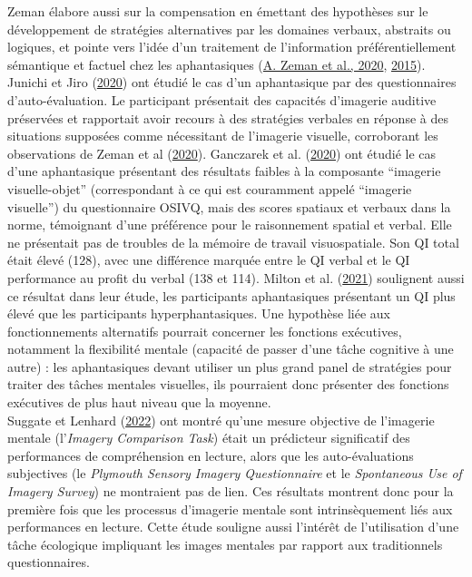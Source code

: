 \documentclass[
  12pt,
]{article}
\begin{document}
Zeman élabore aussi sur la compensation en émettant des hypothèses sur
le développement de stratégies alternatives par les domaines verbaux,
abstraits ou logiques, et pointe vers l'idée d'un traitement de
l'information préférentiellement sémantique et factuel chez les
aphantasiques
(\protect\hyperlink{ref-zemanPhantasiaPsychologicalSignificance2020}{A.
Zeman et al., 2020},
\protect\hyperlink{ref-zemanLivesImageryCongenital2015}{2015}). Junichi
et Jiro
(\protect\hyperlink{ref-junichiPreliminarySinglecaseStudy2020}{2020})
ont étudié le cas d'un aphantasique par des questionnaires
d'auto-évaluation. Le participant présentait des capacités d'imagerie
auditive préservées et rapportait avoir recours à des stratégies
verbales en réponse à des situations supposées comme nécessitant de
l'imagerie visuelle, corroborant les observations de Zeman et al
(\protect\hyperlink{ref-zemanPhantasiaPsychologicalSignificance2020}{2020}).
Ganczarek et al.
(\protect\hyperlink{ref-ganczarekRememberThingsCan2020}{2020}) ont
étudié le cas d'une aphantasique présentant des résultats faibles à la
composante ``imagerie visuelle-objet'' (correspondant à ce qui est
couramment appelé ``imagerie visuelle'') du questionnaire OSIVQ, mais
des scores spatiaux et verbaux dans la norme, témoignant d'une
préférence pour le raisonnement spatial et verbal. Elle ne présentait
pas de troubles de la mémoire de travail visuospatiale. Son QI total
était élevé (128), avec une différence marquée entre le QI verbal et le
QI performance au profit du verbal (138 et 114). Milton et al.
(\protect\hyperlink{ref-miltonBehavioralNeuralSignatures2021}{2021})
soulignent aussi ce résultat dans leur étude, les participants
aphantasiques présentant un QI plus élevé que les participants
hyperphantasiques. Une hypothèse liée aux fonctionnements alternatifs
pourrait concerner les fonctions exécutives, notamment la flexibilité
mentale (capacité de passer d'une tâche cognitive à une autre) : les
aphantasiques devant utiliser un plus grand panel de stratégies pour
traiter des tâches mentales visuelles, ils pourraient donc présenter des
fonctions exécutives de plus haut niveau que la moyenne.\\
Suggate et Lenhard
(\protect\hyperlink{ref-suggateMentalImagerySkill2022}{2022}) ont montré
qu'une mesure objective de l'imagerie mentale (l'\emph{Imagery
Comparison Task}) était un prédicteur significatif des performances de
compréhension en lecture, alors que les auto-évaluations subjectives (le
\emph{Plymouth Sensory Imagery Questionnaire} et le \emph{Spontaneous
Use of Imagery Survey}) ne montraient pas de lien. Ces résultats
montrent donc pour la première fois que les processus d'imagerie mentale
sont intrinsèquement liés aux performances en lecture. Cette étude
souligne aussi l'intérêt de l'utilisation d'une tâche écologique
impliquant les images mentales par rapport aux traditionnels
questionnaires.
\end{document}
